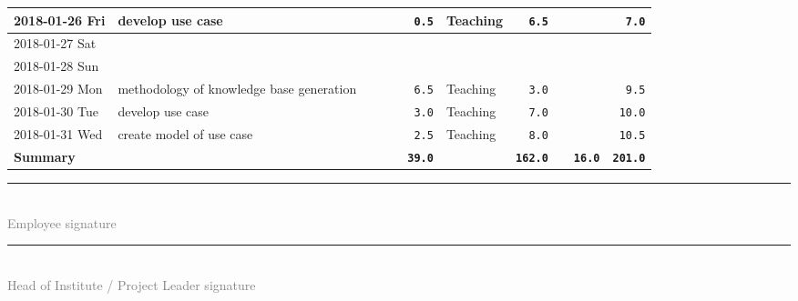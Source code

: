 \documentclass[10pt,a4paper,landscape]{article}
\def\tuwBlue{tuwBlue}
\begin{document}
{\begin{tabular}{|l||p{65mm}|c|c|c|r||p{30mm}|r||p{30mm}|r||r|}
    \rowcolor{\tuwBlue!5!white}
    2018-01-26 Fri & develop use case &  &  &  & \cellcolor{\tuwBlue!20!white} \texttt{0.5} & Teaching & \cellcolor{\tuwBlue!20!white} \texttt{6.5} &  & \cellcolor{\tuwBlue!20!white}  & \cellcolor{red!30!white} \texttt{7.0}
      \\ \hline
    
    \rowcolor{lightgray}
    2018-01-27 Sat &  &  &  &  &  &  &  &  &  & 
      \\ \hline
    
    \rowcolor{lightgray}
    2018-01-28 Sun &  &  &  &  &  &  &  &  &  & 
      \\ \hline
    
    \rowcolor{\tuwBlue!5!white}
    2018-01-29 Mon & methodology of knowledge base generation &  &  &  & \cellcolor{\tuwBlue!20!white} \texttt{6.5} & Teaching & \cellcolor{\tuwBlue!20!white} \texttt{3.0} &  & \cellcolor{\tuwBlue!20!white}  & \cellcolor{\tuwBlue!40!white} \texttt{9.5}
      \\ \hline
    
    \rowcolor{\tuwBlue!5!white}
    2018-01-30 Tue & develop use case &  &  &  & \cellcolor{\tuwBlue!20!white} \texttt{3.0} & Teaching & \cellcolor{\tuwBlue!20!white} \texttt{7.0} &  & \cellcolor{\tuwBlue!20!white}  & \cellcolor{\tuwBlue!40!white} \texttt{10.0}
      \\ \hline
    
    \rowcolor{\tuwBlue!5!white}
    2018-01-31 Wed & create model of use case &  &  &  & \cellcolor{\tuwBlue!20!white} \texttt{2.5} & Teaching & \cellcolor{\tuwBlue!20!white} \texttt{8.0} &  & \cellcolor{\tuwBlue!20!white}  & \cellcolor{\tuwBlue!40!white} \texttt{10.5}
      \\ \hline
    \hline
    \textbf{Summary} &  &  &  &  & \bf \texttt{39.0} &  & \bf \texttt{162.0} &  & \bf \texttt{16.0} & \bf \texttt{201.0}
      \\ \hline
    
    \end{tabular}
    
}

\vspace{10mm}
\begin{center}
  \begin{minipage}[b]{0.4\textwidth}
    \rule{\textwidth}{0.5pt} \\
    \textcolor{gray}{Employee signature}
  \end{minipage}
  \hspace{10mm}
  \begin{minipage}[b]{0.4\textwidth}
    \rule{\textwidth}{0.5pt} \\
    \textcolor{gray}{Head of Institute / Project Leader signature}
  \end{minipage}
\end{center}
\end{document}
